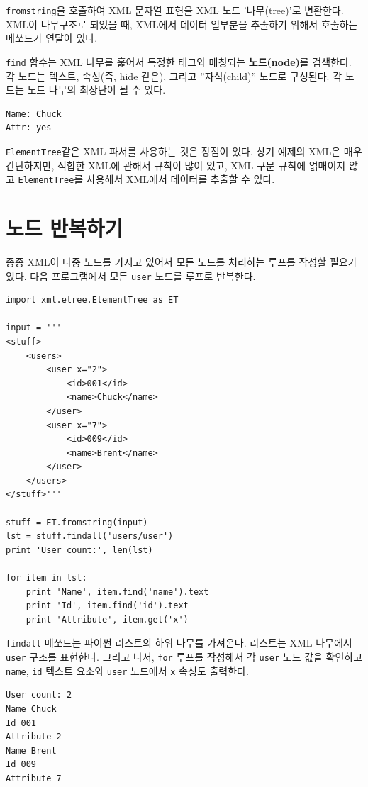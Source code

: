 {\tt fromstring}을 호출하여 XML 문자열 표현을 XML 노드 '나무(tree)'로 변환한다.
XML이 나무구조로 되었을 때, XML에서 데이터 일부분을 추출하기 위해서 호출하는 메쏘드가 연달아 있다.

{\tt find} 함수는 XML 나무를 훑어서 특정한 태그와 매칭되는 {\bf 노드(node)}를 검색한다. 
각 노드는 텍스트, 속성(즉, hide 같은), 그리고 ''자식(child)'' 노드로 구성된다. 
각 노드는 노드 나무의 최상단이 될 수 있다.

\beforeverb
\begin{verbatim}
Name: Chuck
Attr: yes
\end{verbatim}
\afterverb
%

{\tt ElementTree}같은 XML 파서를 사용하는 것은 장점이 있다.
상기 예제의 XML은 매우 간단하지만,
적합한 XML에 관해서 규칙이 많이 있고, XML 구문 규칙에 얽매이지 않고 {\tt ElementTree}를 사용해서 XML에서 데이터를 추출할 수 있다.

\section{노드 반복하기}


종종 XML이 다중 노드를 가지고 있어서 모든 노드를 처리하는 루프를 작성할 필요가 있다.
다음 프로그램에서 모든 {\tt user} 노드를 루프로 반복한다.

\beforeverb
\begin{verbatim}
import xml.etree.ElementTree as ET

input = '''
<stuff>
    <users>
        <user x="2">
            <id>001</id>
            <name>Chuck</name>
        </user>
        <user x="7">
            <id>009</id>
            <name>Brent</name>
        </user>
    </users>
</stuff>'''

stuff = ET.fromstring(input)
lst = stuff.findall('users/user')
print 'User count:', len(lst)

for item in lst:
    print 'Name', item.find('name').text
    print 'Id', item.find('id').text
    print 'Attribute', item.get('x')
\end{verbatim}
\afterverb
%

{\tt findall} 메쏘드는 파이썬 리스트의 하위 나무를 가져온다.
리스트는 XML 나무에서 {\tt user} 구조를 표현한다. 
그리고 나서, {\tt for} 루프를 작성해서 각 {\tt user} 노드 값을 확인하고 {\tt name}, {\tt id} 텍스트 요소와 {\tt user} 노드에서 {\tt x} 속성도 출력한다.

\beforeverb
\begin{verbatim}
User count: 2
Name Chuck
Id 001
Attribute 2
Name Brent
Id 009
Attribute 7
\end{verbatim}
\afterverb
%


